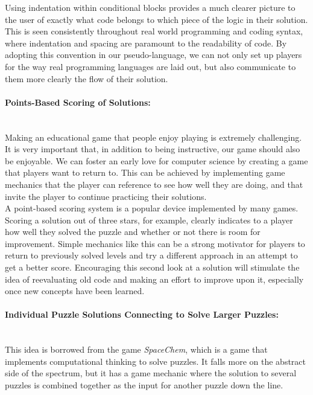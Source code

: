 Using indentation within conditional blocks provides a much clearer picture to the user of exactly what code belongs to which piece of the logic in their solution. This is seen consistently throughout real world programming and coding syntax, where indentation and spacing are paramount to the readability of code. By adopting this convention in our pseudo-language, we can not only set up players for the way real programming languages are laid out, but also communicate to them more clearly the flow of their solution.\\

\paragraph{Points-Based Scoring of Solutions:} ~\\
Making an educational game that people enjoy playing is extremely challenging. It is very important that, in addition to being instructive, our game should also be enjoyable. We can foster an early love for computer science by creating a game that players want to return to. This can be achieved by implementing game mechanics that the player can reference to see how well they are doing, and that invite the player to continue practicing their solutions.\\

A point-based scoring system is a popular device implemented by many games. Scoring a solution out of three stars, for example, clearly indicates to a player how well they solved the puzzle and whether or not there is room for improvement. Simple mechanics like this can be a strong motivator for players to return to previously solved levels and try a different approach in an attempt to get a better score. Encouraging this second look at a solution will stimulate the idea of reevaluating old code and making an effort to improve upon it, especially once new concepts have been learned.\\

\paragraph{Individual Puzzle Solutions Connecting to Solve Larger Puzzles:} ~\\
This idea is borrowed from the game \textit{SpaceChem}, which is a game that implements computational thinking to solve puzzles. It falls more on the abstract side of the spectrum, but it has a game mechanic where the solution to several puzzles is combined together as the input for another puzzle down the line.\\

